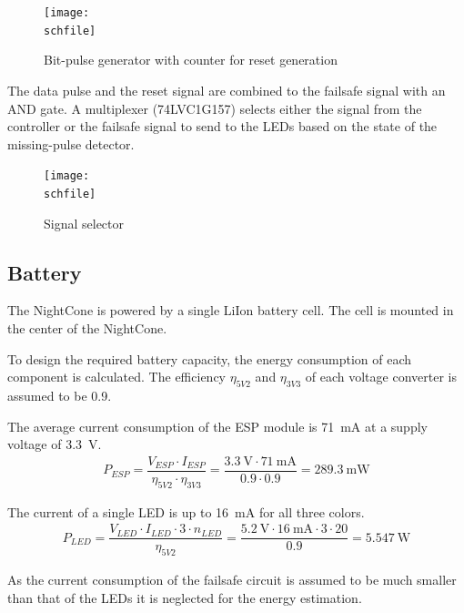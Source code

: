 \begin{figure}[h!]
    \centering
    \texttt{[image: \\schfile]}
    \caption{Bit-pulse generator with counter for reset generation}
    \label{fig_failsafe_bit_counter}
\end{figure}

The data pulse and the reset signal are combined to the failsafe signal with an AND gate. A multiplexer (74LVC1G157) selects either the signal from the controller or the failsafe signal to send to the \acp{LED} based on the state of the missing-pulse detector. 

\begin{figure}[h!]
    \centering
    \texttt{[image: \\schfile]}
    \caption{Signal selector}
    \label{fig_failsafe_mux}
\end{figure}

\FloatBarrier

\subsection{Battery}
\label{battery}
The NightCone is powered by a single \ac{LiIon} battery cell. The cell is mounted in the center of the NightCone. 

To design the required battery capacity, the energy consumption of each component is calculated. The efficiency $\eta_{5V2}$ and $\eta_{3V3}$ of each voltage converter is assumed to be 0.9. 

The average current consumption of the ESP module is \qty{71}{\milli\ampere} at a supply voltage of \qty{3.3}{\volt}. \cite{AIThinker:ESP_12F}
\begin{align}
    P_{ESP} = \dfrac{V_{ESP} \cdot I_{ESP}}{\eta_{5V2} \cdot \eta_{3V3}} = \dfrac{\qty{3.3}{\volt} \cdot \qty{71}{\milli\ampere}}{0.9 \cdot 0.9} = \qty{289.3}{\milli\watt}
\end{align}

The current of a single \ac{LED} is up to \qty{16}{\milli\ampere} for all three colors. \cite{Worldsemi:WS2813E}
\begin{align}
    P_{LED} = \dfrac{V_{LED} \cdot I_{LED} \cdot 3 \cdot n_{LED}}{\eta_{5V2}} = \dfrac{\qty{5.2}{\volt} \cdot \qty{16}{\milli\ampere} \cdot 3 \cdot 20}{0.9} = \qty{5.547}{\watt}
\end{align}

As the current consumption of the failsafe circuit is assumed to be much smaller than that of the \acp{LED} it is neglected for the energy estimation. 

